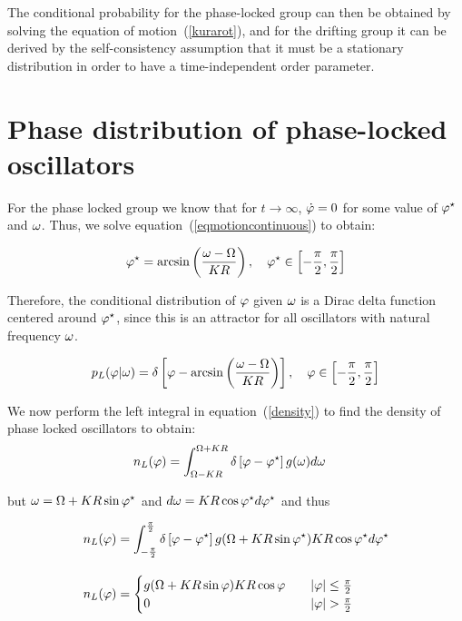 The conditional probability for the phase-locked group can then be obtained by solving the equation of motion~(\ref{kurarot}), and for
the drifting group it can be derived by the self-consistency assumption that it must be a stationary distribution in order to have a
time-independent order parameter.

\section{Phase distribution of phase-locked oscillators}

For the phase locked group we know that for $t \to \infty$, $\dot{\varphi}=0$ for some value of $\varphi^\star$ and $\omega$. Thus,
we solve equation~(\ref{eqmotioncontinuous}) to obtain:

\begin{gather}
    \varphi^\star = \arcsin \left( \frac{\omega - \Omega}{K R} \right), \quad
    \varphi^\star \in \left[ -\frac{\pi}{2}, \frac{\pi}{2} \right] \notag
\end{gather}

Therefore, the conditional distribution of $\varphi$ given $\omega$ is a Dirac delta function centered around $\varphi^\star$,
since this is an attractor for all oscillators with natural frequency $\omega$.

\begin{gather}
    \label{lockedprob}
    p_L(\varphi | \omega) = \delta\left[ \varphi - \arcsin \left( \frac{\omega - \Omega}{K R} \right) \right], \quad
    \varphi \in \left[ -\frac{\pi}{2}, \frac{\pi}{2} \right]
\end{gather}

We now perform the left integral in equation~(\ref{density}) to find the density of phase locked oscillators to obtain:
\begin{align*}
    n_L(\varphi) &= \int_{\Omega - K R}^{\Omega + K R} \delta\left[ \varphi - \varphi^\star \right] g(\omega) d\omega
\end{align*}

\noindent but $\omega = \Omega + K R \sin\varphi^\star$ and $d\omega = K R \cos \varphi^\star d\varphi^\star$ and thus

\begin{align}
    n_L(\varphi) &= \int_{-\frac{\pi}{2}}^{\frac{\pi}{2}} \delta \left[ \varphi - \varphi^\star \right] g(\Omega + K R \sin
    \varphi^\star) K R \cos \varphi^\star d\varphi^\star \notag\\[10pt]
    n_L(\varphi) &=
    \begin{cases}
        g(\Omega + K R \sin\varphi) K R \cos\varphi \quad &|\varphi| \leq \frac{\pi}{2}\\
        0 & |\varphi| > \frac{\pi}{2}
    \end{cases}
    \label{densitylocked}
\end{align}

